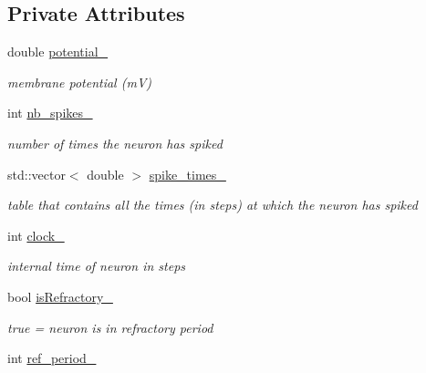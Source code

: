 \subsection*{Private Attributes}
\begin{DoxyCompactItemize}
\item 
\hypertarget{classNeuron_a91b43a5da7310e83fa2b66bf1be87b66}{double \hyperlink{classNeuron_a91b43a5da7310e83fa2b66bf1be87b66}{potential\-\_\-}}\label{classNeuron_a91b43a5da7310e83fa2b66bf1be87b66}

\begin{DoxyCompactList}\small\item\em membrane potential (m\-V) \end{DoxyCompactList}\item 
\hypertarget{classNeuron_a312f0cc4b6de4cc6af073a9d9f08eb1f}{int \hyperlink{classNeuron_a312f0cc4b6de4cc6af073a9d9f08eb1f}{nb\-\_\-spikes\-\_\-}}\label{classNeuron_a312f0cc4b6de4cc6af073a9d9f08eb1f}

\begin{DoxyCompactList}\small\item\em number of times the neuron has spiked \end{DoxyCompactList}\item 
\hypertarget{classNeuron_abb1adeb01609bc724b0a85bab391c7c1}{std\-::vector$<$ double $>$ \hyperlink{classNeuron_abb1adeb01609bc724b0a85bab391c7c1}{spike\-\_\-times\-\_\-}}\label{classNeuron_abb1adeb01609bc724b0a85bab391c7c1}

\begin{DoxyCompactList}\small\item\em table that contains all the times (in steps) at which the neuron has spiked \end{DoxyCompactList}\item 
\hypertarget{classNeuron_abf13191442f1c0b321e0f9212aec527e}{int \hyperlink{classNeuron_abf13191442f1c0b321e0f9212aec527e}{clock\-\_\-}}\label{classNeuron_abf13191442f1c0b321e0f9212aec527e}

\begin{DoxyCompactList}\small\item\em internal time of neuron in steps \end{DoxyCompactList}\item 
\hypertarget{classNeuron_aa6e94a5eb941f7e290d9d91056d2ead0}{bool \hyperlink{classNeuron_aa6e94a5eb941f7e290d9d91056d2ead0}{is\-Refractory\-\_\-}}\label{classNeuron_aa6e94a5eb941f7e290d9d91056d2ead0}

\begin{DoxyCompactList}\small\item\em true = neuron is in refractory period \end{DoxyCompactList}\item 
\hypertarget{classNeuron_a4aa349202672fe80f979b30c8f1f6fec}{int \hyperlink{classNeuron_a4aa349202672fe80f979b30c8f1f6fec}{ref\-\_\-period\-\_\-}}\label{classNeuron_a4aa349202672fe80f979b30c8f1f6fec}


\end{DoxyCompactItemize}
